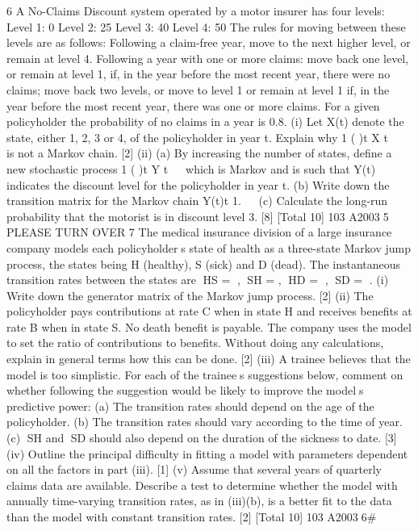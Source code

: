 
6 A No-Claims Discount system operated by a motor insurer has four levels:
Level 1: 0%
Level 2: 25%
Level 3: 40%
Level 4: 50%
The rules for moving between these levels are as follows:
Following a claim-free year, move to the next higher level, or remain at
level 4.
Following a year with one or more claims:
move back one level, or remain at level 1, if, in the year before the
most recent year, there were no claims;
move back two levels, or move to level 1 or remain at level 1 if, in the
year before the most recent year, there was one or more claims.
For a given policyholder the probability of no claims in a year is 0.8.
(i) Let X(t) denote the state, either 1, 2, 3 or 4, of the policyholder in year t.
Explain why 1 { ( )}t X t 
 is not a Markov chain. [2]
(ii) (a) By increasing the number of states, define a new stochastic process
1 { ( )}t Y t 
 which is Markov and is such that Y(t) indicates the discount
level for the policyholder in year t.
(b) Write down the transition matrix for the Markov chain {Y(t)}t 1. 

(c) Calculate the long-run probability that the motorist is in discount
level 3.
[8]
[Total 10]
103 A20035 PLEASE TURN OVER
7 The medical insurance division of a large insurance company models each
policyholders state of health as a three-state Markov jump process, the states being
H (healthy), S (sick) and D (dead). The instantaneous transition rates between the
states are HS = , SH = 
, HD = , SD = .
(i) Write down the generator matrix of the Markov jump process. [2]
(ii) The policyholder pays contributions at rate C when in state H and receives
benefits at rate B when in state S. No death benefit is payable. The company
uses the model to set the ratio of contributions to benefits. Without doing any
calculations, explain in general terms how this can be done. [2]
(iii) A trainee believes that the model is too simplistic. For each of the trainees
suggestions below, comment on whether following the suggestion would be
likely to improve the models predictive power:
(a) The transition rates should depend on the age of the policyholder.
(b) The transition rates should vary according to the time of year.
(c) SH and SD should also depend on the duration of the sickness to date.
[3]
(iv) Outline the principal difficulty in fitting a model with parameters dependent
on all the factors in part (iii). [1]
(v) Assume that several years of quarterly claims data are available. Describe a
test to determine whether the model with annually time-varying transition
rates, as in (iii)(b), is a better fit to the data than the model with constant
transition rates. [2]
[Total 10]
103 A20036#

